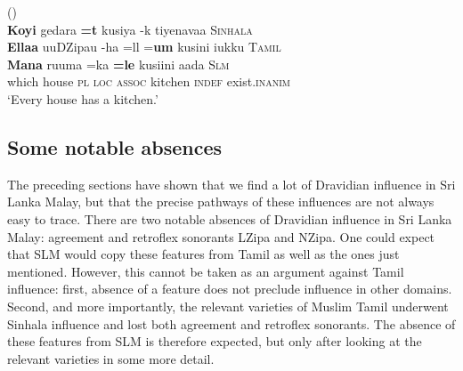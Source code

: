 \documentclass{article}
\newcommand{\R}{\textipa{\textsubbar{r}}}
\renewcommand{\lz}{LZipa}
\renewcommand{\dz}{DZipa}
\renewcommand{\nz}{NZipa}
\renewcommand{\ea}{()\\}
\begin{document}
\ea \label{ex:whclt}
\gllll \textbf{Koyi}  gedara   {}   {}   \textbf{=t}    kusiya  -k    tiyenavaa   \textsc{Sinhala} \\
\textbf{Ellaa} uu{\dz}u     -ha =ll =\textbf{um}   kusini  {}    i{\R}ukku      \textsc{Tamil} \\
\textbf{Mana}  ruuma    {}   =ka \textbf{=le}   kusiini {}     aada         \textsc{Slm} \\  
which house    \textsc{pl}  \textsc{loc} \textsc{assoc} kitchen \textsc{indef} exist.\textsc{inanim} \\
`Every house has a kitchen.'
\z


\subsection{Some notable absences}
The preceding sections have shown that we find a lot of Dravidian influence in Sri Lanka Malay, but that the precise pathways of these influences are not always easy to trace. There are two notable absences of Dravidian influence in Sri Lanka Malay: agreement and retroflex sonorants {\lz} and {\nz}. One could expect that SLM would copy these features from Tamil as well as the ones just mentioned. However, this cannot be taken as an argument against Tamil influence: first, absence of a feature does not preclude influence in other domains. Second, and more importantly, the relevant varieties of Muslim Tamil underwent Sinhala influence and lost both agreement and retroflex sonorants. The absence of these features from SLM is therefore expected, but only after looking at the relevant varieties in some more detail.



\end{document}
